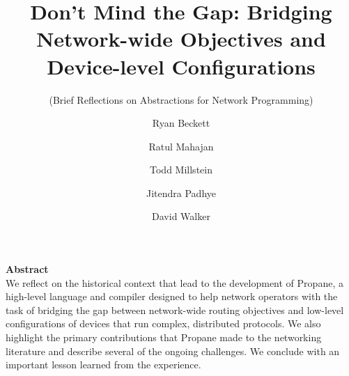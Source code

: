 \documentclass[10pt]{sigalternate052015}
\newcommand{\sysname}{{\small \sf Propane}\xspace}
\begin{document}




\title{Don't Mind the Gap:  Bridging Network-wide Objectives and
  Device-level Configurations}

\subtitle{
  (Brief Reflections on Abstractions
  for Network Programming)
  }



\author{%
Ryan Beckett\\
\and
Ratul Mahajan\\
\and
Todd Millstein\\
\and
Jitendra Padhye\\
\and
David Walker\\
}

\maketitle


\noindent
\textbf{Abstract} \\
We reflect on the historical context that lead to the development of
\sysname,
a high-level language and compiler designed to help network operators
with the task
of bridging the gap between network-wide routing objectives and low-level configurations of devices that run complex, distributed protocols.
We also highlight the primary contributions that Propane made to the
networking literature and describe several of the ongoing challenges.
We conclude with an important lesson learned from the experience.



%
%
%
%
\end{document}
